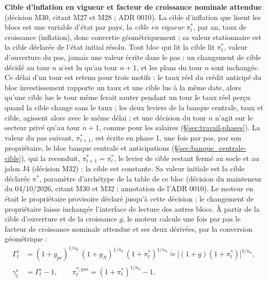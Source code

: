 \documentclass[11pt,a4paper]{article}
\begin{document}
\begin{proposee}
\textbf{Cible d'inflation en vigueur et facteur de croissance nominale attendue} (décision M30, citant M27 et M28 ; ADR 0010). La cible d'inflation que lisent les blocs est une variable d'état par pays, la \emph{cible en vigueur} $\pi^\ast_t$, par an, taux de croissance (inflation), donc convertie géométriquement ; sa valeur stationnaire est la cible déclarée de l'état initial résolu. Tout bloc qui lit la cible lit $\pi^\ast_t$, valeur d'ouverture du pas, jamais une valeur écrite dans le pas : un changement de cible décidé au tour $n$ n'est lu qu'au tour $n + 1$, et les plans du tour $n$ sont inchangés. Ce délai d'un tour est retenu pour trois motifs : le taux réel du crédit anticipé du bloc investissement rapporte un taux et une cible lus à la même date, alors qu'une cible lue le tour même ferait sauter pendant un tour le taux réel perçu quand la cible change sans le taux ; les deux leviers de la banque centrale, taux et cible, agissent alors avec le même délai ; et une décision du tour $n$ n'agit sur le secteur privé qu'au tour $n + 1$, comme pour les salaires (\S\ref{sec:travail-phases}). La valeur du pas suivant, $\pi^\ast_{t+1}$, est écrite en phase 1, une fois par pas, par son propriétaire, le bloc banque centrale et anticipations (\S\ref{sec:banque_centrale-cible}), qui la reconduit, $\pi^\ast_{t+1} = \pi^\ast_t$, le levier de cible restant fermé au socle et au jalon J4 (décision M32) : la cible est constante. Sa valeur initiale est la cible déclarée $\pi^\ast$, paramètre d'archétype de la table de ce bloc (décision du mainteneur du 04/10/2026, citant M30 et M32 ; annotation de l'ADR 0010). Le moteur en était le propriétaire provisoire déclaré jusqu'à cette décision ; le changement de propriétaire laisse inchangée l'interface de lecture des autres blocs. À partir de la cible d'ouverture et de la croissance $g$, le moteur calcule une fois par pas le facteur de croissance nominale attendue et ses deux dérivées, par la conversion géométrique :
\begin{equation}\label{eq:moteur-croissance-nominale-attendue}
\begin{aligned}
\Gamma^e_t &= (1 + g_{\mathit{pr}})^{1/n_a}\,(1 + g_N)^{1/n_a}\,(1 + \pi^\ast_t)^{1/n_a} \simeq \bigl[(1 + g)(1 + \pi^\ast_t)\bigr]^{1/n_a}, \\
\gamma^e_t &= \Gamma^e_t - 1, \qquad \pi^{\ast,\mathrm{pas}}_t = (1 + \pi^\ast_t)^{1/n_a} - 1 .

\end{aligned}
\end{equation}
\end{proposee}
\end{document}
